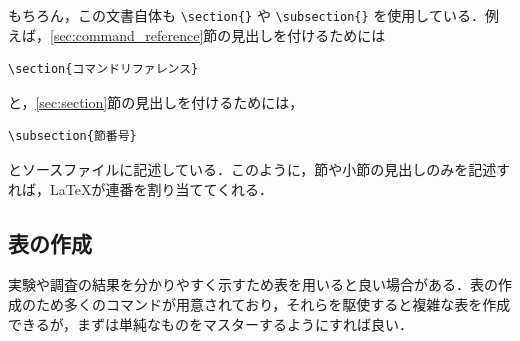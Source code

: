 もちろん，この文書自体も \verb|\section{}| や \verb|\subsection{}| を使用している．例えば，\ref{sec:command_reference}節の見出しを付けるためには
\begin{screen}
\begin{verbatim}
\section{コマンドリファレンス}
\end{verbatim}
\end{screen}
と，\ref{sec:section}節の見出しを付けるためには，
\begin{screen}
\begin{verbatim}
\subsection{節番号}
\end{verbatim}
\end{screen}
とソースファイルに記述している．このように，節や小節の見出しのみを記述すれば，\LaTeX が連番を割り当ててくれる．

\subsection{表の作成}
\label{sec:table}

実験や調査の結果を分かりやすく示すため表を用いると良い場合がある．表の作成のため多くのコマンドが用意されており，それらを駆使すると複雑な表を作成できるが，まずは単純なものをマスターするようにすれば良い．

